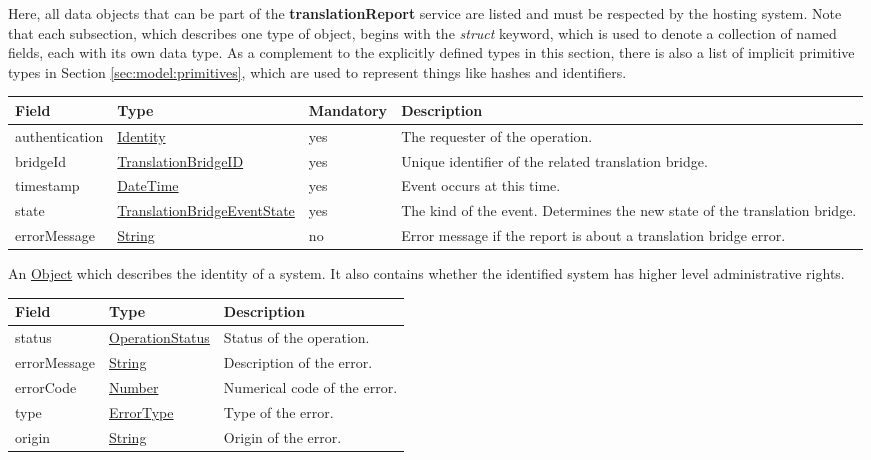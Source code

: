 \documentclass[a4paper]{arrowhead}
\newcommand{\pref}[1]{{\textcolor{ArrowheadGrey}{\hyperref[sec:model:primitives:#1]{#1}}}}
\begin{document}
Here, all data objects that can be part of the \textbf{translationReport} service are listed and must be respected by the hosting system.
Note that each subsection, which describes one type of object, begins with the \textit{struct} keyword, which is used to denote a collection of named fields, each with its own data type.
As a complement to the explicitly defined types in this section, there is also a list of implicit primitive types in Section \ref{sec:model:primitives}, which are used to represent things like hashes and identifiers.

 
\begin{table}[ht!]
\begin{tabularx}{\textwidth}{| p{3.9cm} | p{6.2cm} | p{1.3cm} | X |} \hline
\rowcolor{gray!33} Field & Type & Mandatory & Description \\ \hline
authentication &\hyperref[sec:model:Identity]{Identity} & yes & The re\-ques\-ter of the operation. \\ \hline
bridgeId & \pref{TranslationBridgeID} & yes & Unique identifier of the related translation bridge. \\ \hline
timestamp & \pref{DateTime} & yes & Event occurs at this time. \\ \hline
state & \pref{TranslationBridgeEventState} & yes & The kind of the event. Determines the new state of the translation bridge. \\ \hline
errorMessage & \pref{String} & no & Error message if the report is about a translation bridge error. \\ \hline
\end{tabularx}
\end{table}


An \pref{Object} which describes the identity of a system. It also contains whether the identified system has higher level administrative rights.


\begin{table}[ht!]
\begin{tabularx}{\textwidth}{| p{4.25cm} | p{3.5cm} | X |} \hline
\rowcolor{gray!33} Field & Type      & Description \\ \hline
status & \pref{OperationStatus} & Status of the operation. \\ \hline
errorMessage & \pref{String} & Description of the error. \\ \hline
errorCode &\pref{Number}  & Numerical code of the error. \\ \hline
type & \pref{ErrorType} & Type of the error. \\ \hline
origin & \pref{String} & Origin of the error. \\ \hline
\end{tabularx}
\end{table}
\end{document}
